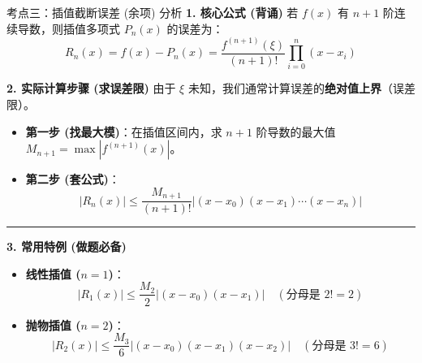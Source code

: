 \documentclass[12pt, a4paper]{article}
\begin{document}
\begin{knowpoint}{考点三：插值截断误差 (余项) 分析}
    \textbf{1. 核心公式 (背诵)}
    若 $f(x)$ 有 $n+1$ 阶连续导数，则插值多项式 $P_n(x)$ 的误差为：
    \[ R_n(x) = f(x) - P_n(x) = \frac{f^{(n+1)}(\xi)}{(n+1)!} \prod_{i=0}^{n} (x - x_i) \]
    
    \textbf{2. 实际计算步骤 (求误差限)}
    由于 $\xi$ 未知，我们通常计算误差的\textbf{绝对值上界}（误差限）。
    \begin{itemize}
        \item \textbf{第一步 (找最大模)}：在插值区间内，求 $n+1$ 阶导数的最大值 $M_{n+1} = \max |f^{(n+1)}(x)|$。
        \item \textbf{第二步 (套公式)}：
        \[ |R_n(x)| \le \frac{M_{n+1}}{(n+1)!} \left| (x-x_0)(x-x_1)\cdots(x-x_n) \right| \]
    \end{itemize}

    \vspace{0.5em}
    \hrule
    \vspace{0.5em}

    \textbf{3. 常用特例 (做题必备)}
    \begin{itemize}
        \item \textbf{线性插值 ($n=1$)}：
        \[ |R_1(x)| \le \frac{M_2}{2} |(x-x_0)(x-x_1)| \quad (\text{分母是 } 2! = 2) \]
        \item \textbf{抛物插值 ($n=2$)}：
        \[ |R_2(x)| \le \frac{M_3}{6} |(x-x_0)(x-x_1)(x-x_2)| \quad (\text{分母是 } 3! = 6) \]
    \end{itemize}
\end{knowpoint}
\end{document}
